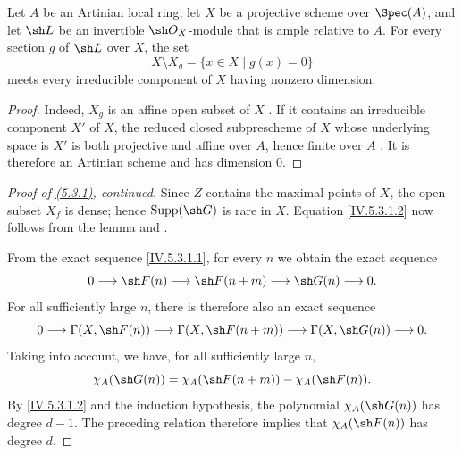 \begin{lemma}[5.3.1.3]
\label{IV.5.3.1.3}
Let $A$ be an Artinian local ring, let $X$ be a projective scheme over
$\Spec(A)$, and let $\sh L$ be an invertible $\sh O_X$-module that is
ample relative to $A$.
For every section $g$ of $\sh L$ over $X$, the set
\[
X\setminus X_g=\{x\in X\mid g(x)=0\}
\]
meets every irreducible component of $X$ having nonzero dimension.
\end{lemma}

\begin{proof}
Indeed, $X_g$ is an affine open subset of $X$
.
If it contains an irreducible component $X'$ of $X$, the reduced
closed subprescheme of $X$ whose underlying space is $X'$ is both
projective and affine over $A$, hence finite over $A$
.
It is therefore an Artinian scheme and has dimension $0$.
\end{proof}

\begin{proof}[Proof of \emph{{\hyperref[IV.5.3.1]{(5.3.1)}}}, continued]
Since $Z$ contains the maximal points of $X$, the open subset $X_f$
is dense; hence $\operatorname{Supp}(\sh G)$ is rare in $X$.
Equation \eqref{IV.5.3.1.2} now follows from the lemma and
.


From the exact sequence \eqref{IV.5.3.1.1}, for every $n$ we obtain
the exact sequence
\[
0\longrightarrow\sh F(n)
 \longrightarrow\sh F(n+m)
 \longrightarrow\sh G(n)
 \longrightarrow0.
\]
For all sufficiently large $n$, there is therefore also an exact
sequence 
\[
0\longrightarrow\Gamma(X,\sh F(n))
 \longrightarrow\Gamma(X,\sh F(n+m))
 \longrightarrow\Gamma(X,\sh G(n))
 \longrightarrow0.
\]
Taking  into account, we have, for all
sufficiently large $n$,
\[
\chi_A(\sh G(n))
  =\chi_A(\sh F(n+m))-\chi_A(\sh F(n)).
\]
By \eqref{IV.5.3.1.2} and the induction hypothesis, the polynomial
$\chi_A(\sh G(n))$ has degree $d-1$.
The preceding relation therefore implies that
$\chi_A(\sh F(n))$ has degree $d$.
\end{proof}
